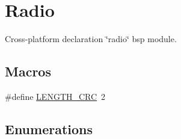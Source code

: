 \hypertarget{group__radio}{}\section{Radio}
\label{group__radio}


Cross-\/platform declaration \char`\"{}radio\char`\"{} bsp module.  


\subsection*{Macros}
\begin{DoxyCompactItemize}
\item 
\#define \hyperlink{group__radio_ga66b45cefa7e813509629dfff0680c50b}{L\+E\+N\+G\+T\+H\+\_\+\+C\+RC}~2
\end{DoxyCompactItemize}
\subsection*{Enumerations}

